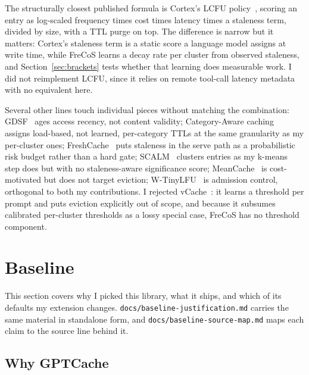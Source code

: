\documentclass[10pt]{article}
\begin{document}
The structurally closest published formula is Cortex's LCFU policy~\cite{cortex2026},
scoring an entry as log-scaled frequency times cost times latency times a staleness term,
divided by size, with a TTL purge on top. The difference is narrow but it matters:
Cortex's staleness term is a static score a language model assigns at write time, while
FreCoS learns a decay rate per cluster from observed staleness, and
Section~\ref{sec:brackets} tests whether that learning does measurable work. I did not
reimplement LCFU, since it relies on remote tool-call latency metadata with no equivalent
here.

Several other lines touch individual pieces without matching the combination:
GDSF~\cite{gdsf2001} ages access recency, not content validity; Category-Aware
caching~\cite{categoryaware2025} assigns load-based, not learned, per-category TTLs at the
same granularity as my per-cluster ones; FreshCache~\cite{freshcache2026} puts staleness in
the serve path as a probabilistic risk budget rather than a hard gate;
SCALM~\cite{scalm2024} clusters entries
as my k-means step does but with no staleness-aware significance score;
MeanCache~\cite{meancache2024} is cost-motivated but does not target eviction;
W-TinyLFU~\cite{tinylfu2015} is admission control, orthogonal to both my contributions. I
rejected vCache~\cite{vcache2025}: it learns a threshold per prompt and puts eviction
explicitly out of scope, and because it subsumes calibrated per-cluster thresholds as a lossy
special case, FreCoS has no threshold component.

\section{Baseline}

This section covers why I picked this library, what it ships, and which of its defaults my
extension changes. \texttt{docs/baseline-justification.md} carries the same material in
standalone form, and \texttt{docs/baseline-source-map.md} maps each claim to the source line
behind it.

\subsection{Why GPTCache}
\end{document}
